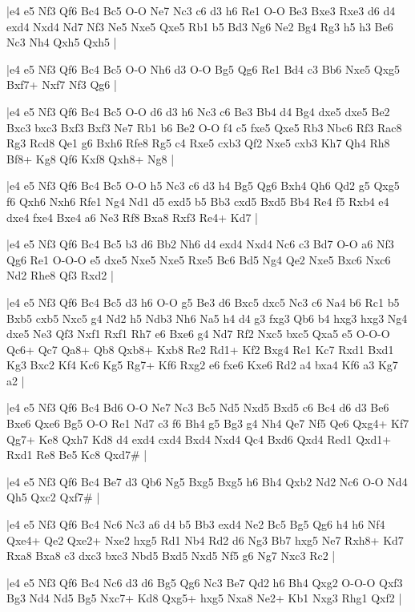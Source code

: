 \whitename{}
\blackname{}
\makegametitle
|e4 e5 Nf3 Qf6 Bc4 Bc5 O-O Ne7 Nc3 c6 d3 h6 Re1 O-O Be3 Bxe3 Rxe3 d6 d4 exd4 Nxd4 Nd7 Nf3 Ne5 Nxe5 Qxe5 Rb1 b5 Bd3 Ng6 Ne2 Bg4 Rg3 h5 h3 Be6 Nc3 Nh4 Qxh5 Qxh5  |

\whitename{}
\blackname{}
\makegametitle
|e4 e5 Nf3 Qf6 Bc4 Bc5 O-O Nh6 d3 O-O Bg5 Qg6 Re1 Bd4 c3 Bb6 Nxe5 Qxg5 Bxf7+ Nxf7 Nf3 Qg6  |

\whitename{}
\blackname{}
\makegametitle
|e4 e5 Nf3 Qf6 Bc4 Bc5 O-O d6 d3 h6 Nc3 c6 Be3 Bb4 d4 Bg4 dxe5 dxe5 Be2 Bxc3 bxc3 Bxf3 Bxf3 Ne7 Rb1 b6 Be2 O-O f4 c5 fxe5 Qxe5 Rb3 Nbc6 Rf3 Rac8 Rg3 Rcd8 Qe1 g6 Bxh6 Rfe8 Rg5 c4 Rxe5 cxb3 Qf2 Nxe5 cxb3 Kh7 Qh4 Rh8 Bf8+ Kg8 Qf6 Kxf8 Qxh8+ Ng8  |

\whitename{}
\blackname{}
\makegametitle
|e4 e5 Nf3 Qf6 Bc4 Bc5 O-O h5 Nc3 c6 d3 h4 Bg5 Qg6 Bxh4 Qh6 Qd2 g5 Qxg5 f6 Qxh6 Nxh6 Rfe1 Ng4 Nd1 d5 exd5 b5 Bb3 cxd5 Bxd5 Bb4 Re4 f5 Rxb4 e4 dxe4 fxe4 Bxe4 a6 Ne3 Rf8 Bxa8 Rxf3 Re4+ Kd7  |

\whitename{}
\blackname{}
\makegametitle
|e4 e5 Nf3 Qf6 Bc4 Bc5 b3 d6 Bb2 Nh6 d4 exd4 Nxd4 Nc6 c3 Bd7 O-O a6 Nf3 Qg6 Re1 O-O-O e5 dxe5 Nxe5 Nxe5 Rxe5 Bc6 Bd5 Ng4 Qe2 Nxe5 Bxc6 Nxc6 Nd2 Rhe8 Qf3 Rxd2  |

\whitename{}
\blackname{}
\makegametitle
|e4 e5 Nf3 Qf6 Bc4 Bc5 d3 h6 O-O g5 Be3 d6 Bxc5 dxc5 Nc3 c6 Na4 b6 Rc1 b5 Bxb5 cxb5 Nxc5 g4 Nd2 h5 Ndb3 Nh6 Na5 h4 d4 g3 fxg3 Qb6 b4 hxg3 hxg3 Ng4 dxe5 Ne3 Qf3 Nxf1 Rxf1 Rh7 e6 Bxe6 g4 Nd7 Rf2 Nxc5 bxc5 Qxa5 e5 O-O-O Qc6+ Qc7 Qa8+ Qb8 Qxb8+ Kxb8 Re2 Rd1+ Kf2 Bxg4 Re1 Kc7 Rxd1 Bxd1 Kg3 Bxc2 Kf4 Kc6 Kg5 Rg7+ Kf6 Rxg2 e6 fxe6 Kxe6 Rd2 a4 bxa4 Kf6 a3 Kg7 a2  |

\whitename{}
\blackname{}
\makegametitle
|e4 e5 Nf3 Qf6 Bc4 Bd6 O-O Ne7 Nc3 Bc5 Nd5 Nxd5 Bxd5 c6 Bc4 d6 d3 Be6 Bxe6 Qxe6 Bg5 O-O Re1 Nd7 c3 f6 Bh4 g5 Bg3 g4 Nh4 Qe7 Nf5 Qe6 Qxg4+ Kf7 Qg7+ Ke8 Qxh7 Kd8 d4 exd4 cxd4 Bxd4 Nxd4 Qc4 Bxd6 Qxd4 Red1 Qxd1+ Rxd1 Re8 Be5 Kc8 Qxd7\#  |

\whitename{}
\blackname{}
\makegametitle
|e4 e5 Nf3 Qf6 Bc4 Be7 d3 Qb6 Ng5 Bxg5 Bxg5 h6 Bh4 Qxb2 Nd2 Nc6 O-O Nd4 Qh5 Qxc2 Qxf7\#  |

\whitename{}
\blackname{}
\makegametitle
|e4 e5 Nf3 Qf6 Bc4 Nc6 Nc3 a6 d4 b5 Bb3 exd4 Ne2 Bc5 Bg5 Qg6 h4 h6 Nf4 Qxe4+ Qe2 Qxe2+ Nxe2 hxg5 Rd1 Nb4 Rd2 d6 Ng3 Bb7 hxg5 Ne7 Rxh8+ Kd7 Rxa8 Bxa8 c3 dxc3 bxc3 Nbd5 Bxd5 Nxd5 Nf5 g6 Ng7 Nxc3 Rc2  |

\whitename{}
\blackname{}
\makegametitle
|e4 e5 Nf3 Qf6 Bc4 Nc6 d3 d6 Bg5 Qg6 Nc3 Be7 Qd2 h6 Bh4 Qxg2 O-O-O Qxf3 Bg3 Nd4 Nd5 Bg5 Nxc7+ Kd8 Qxg5+ hxg5 Nxa8 Ne2+ Kb1 Nxg3 Rhg1 Qxf2  |

